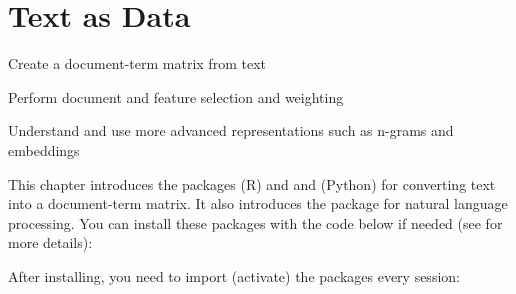 \chapter{Text as Data}
\label{chap:dtm}

\begin{abstract}{Abstract}
  This chapter shows how you can analyze texts that are stored as a data frame column or variable using functions from the package  in R and the package  in Python and R.
  Please see  for more information on reading and cleaning text.
  
\end{abstract}


\begin{objectives}
\item Create a document-term matrix from text
\item Perform  document and feature selection and weighting
\item Understand and use more advanced representations such as n-grams and embeddings
\end{objectives}


\newpage
\begin{feature}
  This chapter introduces the packages  (R) and  and  (Python) for converting text into a document-term matrix. It also introduces the  package for natural language processing. 
You can install these packages with the code below if needed  (see  for more details):


\noindent After installing, you need to import (activate) the packages every session:


\end{feature}





